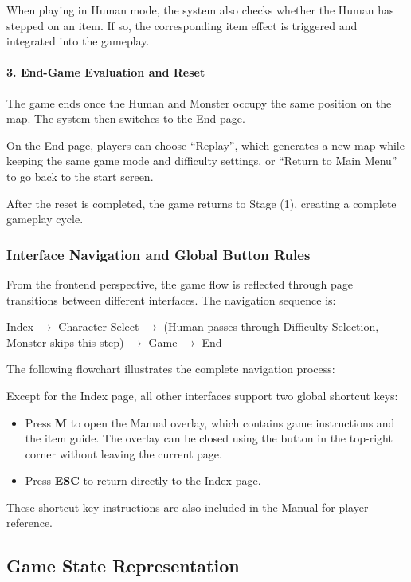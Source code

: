When playing in Human mode, the system also checks whether the Human has stepped on an item. If so, the corresponding item effect is triggered and integrated into the gameplay.

\paragraph{3. End-Game Evaluation and Reset}
The game ends once the Human and Monster occupy the same position on the map. The system then switches to the End page.

On the End page, players can choose ``Replay'', which generates a new map while keeping the same game mode and difficulty settings, or ``Return to Main Menu'' to go back to the start screen.

After the reset is completed, the game returns to Stage (1), creating a complete gameplay cycle.

\subsubsection{Interface Navigation and Global Button Rules}

From the frontend perspective, the game flow is reflected through page transitions between different interfaces. The navigation sequence is:

\begin{center}
Index $\rightarrow$ Character Select $\rightarrow$ (Human passes through Difficulty Selection, Monster skips this step) $\rightarrow$ Game $\rightarrow$ End
\end{center}

The following flowchart illustrates the complete navigation process:


Except for the Index page, all other interfaces support two global shortcut keys:

\begin{itemize}
    \item Press \textbf{M} to open the Manual overlay, which contains game instructions and the item guide. The overlay can be closed using the button in the top-right corner without leaving the current page.
    \item Press \textbf{ESC} to return directly to the Index page.
\end{itemize}

These shortcut key instructions are also included in the Manual for player reference.

\subsection{Game State Representation}

